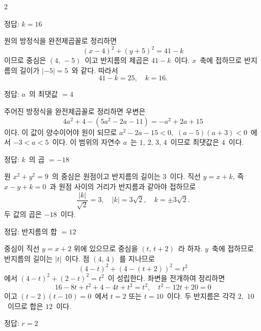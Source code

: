 \documentclass[10pt,fleqn]{article}
\begin{document}
\begin{multicols*}{2}
\begin{dmanswerbox}
정답: $k=16$
\end{dmanswerbox}

원의 방정식을 완전제곱꼴로 정리하면
\[ (x-4)^2 + (y+5)^2 = 41 - k \]
이므로 중심은 $(4,\, -5)$\ 이고 반지름의 제곱은 $41 - k$\ 이다. $x$\ 축에 접하므로 반지름의 길이가 $|-5| = 5$\ 와 같다. 따라서
\[ 41 - k = 25,\quad k = 16. \]

\begin{dmanswerbox}
정답: $a$\ 의 최댓값 $=4$
\end{dmanswerbox}

주어진 방정식을 완전제곱꼴로 정리하면 우변은
\[ 4a^2 + 4 - (5a^2 - 2a - 11) = -a^2 + 2a + 15 \]
이다. 이 값이 양수이어야 원이 되므로 $a^2 - 2a - 15 < 0$,\ $(a-5)(a+3) < 0$\ 에서 $-3 < a < 5$\ 이다. 이 범위의 자연수 $a$\ 는 $1,\, 2,\, 3,\, 4$\ 이므로 최댓값은 $4$\ 이다.

\begin{dmanswerbox}
정답: $k$\ 의 곱 $=-18$
\end{dmanswerbox}

원 $x^2 + y^2 = 9$\ 의 중심은 원점이고 반지름의 길이는 $3$\ 이다. 직선 $y = x + k$, 즉 $x - y + k = 0$\ 과 원점 사이의 거리가 반지름과 같아야 접하므로
\[ \dfrac{|k|}{\sqrt{2}} = 3,\quad |k| = 3\sqrt{2},\quad k = \pm 3\sqrt{2}. \]
두 값의 곱은 $-18$\ 이다.

\begin{dmanswerbox}
정답: 반지름의 합 $=12$
\end{dmanswerbox}

중심이 직선 $y = x + 2$ 위에 있으므로 중심을 $(t,\, t+2)$\ 라 하자. $y$\ 축에 접하므로 반지름의 길이는 $|t|$\ 이다. 점 $(4,\, 4)$\ 를 지나므로
\[ (4-t)^2 + (4-(t+2))^2 = t^2 \]
에서 $(4-t)^2 + (2-t)^2 = t^2$\ 이 성립한다. 좌변을 전개하여 정리하면
\[ 16 - 8t + t^2 + 4 - 4t + t^2 = t^2,\quad t^2 - 12t + 20 = 0 \]
이고 $(t-2)(t-10) = 0$\ 에서 $t = 2$ 또는 $t = 10$\ 이다. 두 반지름은 각각 $2$,\ $10$\ 이므로 합은 $12$\ 이다.

\begin{dmanswerbox}
정답: $r=2$
\end{dmanswerbox}


\end{multicols*}
\end{document}
